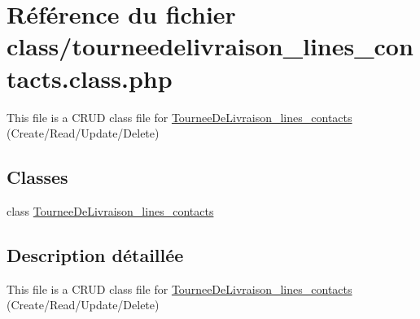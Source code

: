 \hypertarget{tourneedelivraison__lines__contacts_8class_8php}{}\section{Référence du fichier class/tourneedelivraison\+\_\+lines\+\_\+contacts.class.\+php}
\label{tourneedelivraison__lines__contacts_8class_8php}


This file is a C\+R\+UD class file for \hyperlink{classTourneeDeLivraison__lines__contacts}{Tournee\+De\+Livraison\+\_\+lines\+\_\+contacts} (Create/\+Read/\+Update/\+Delete)  


\subsection*{Classes}
\begin{DoxyCompactItemize}
\item 
class \hyperlink{classTourneeDeLivraison__lines__contacts}{Tournee\+De\+Livraison\+\_\+lines\+\_\+contacts}
\end{DoxyCompactItemize}


\subsection{Description détaillée}
This file is a C\+R\+UD class file for \hyperlink{classTourneeDeLivraison__lines__contacts}{Tournee\+De\+Livraison\+\_\+lines\+\_\+contacts} (Create/\+Read/\+Update/\+Delete) 

